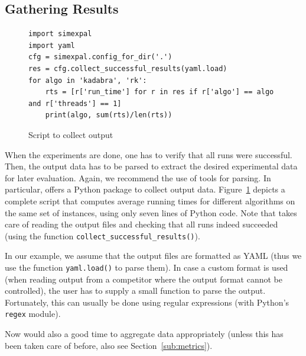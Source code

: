 \documentclass[algorithms,article,submit,moreauthors,pdftex]{Definitions/mdpi}
\begin{document}
\subsection{Gathering Results}
\label{sub:gather-results}
%
\begin{figure}
\scriptsize
\begin{verbatim}
import simexpal
import yaml
cfg = simexpal.config_for_dir('.')
res = cfg.collect_successful_results(yaml.load)
for algo in 'kadabra', 'rk':
    rts = [r['run_time'] for r in res if r['algo'] == algo and r['threads'] == 1]
    print(algo, sum(rts)/len(rts))
\end{verbatim}
\caption{Script to collect \kad output}
\label{fig:exptool_collect}
\end{figure}
%
When the experiments are done, one has to verify that all runs were successful.
Then, the output data has to be parsed to extract the desired experimental
data for later evaluation. Again, we recommend the use of tools for parsing.
In particular, \exptool offers a Python package to collect output data.
Figure~\ref{fig:exptool_collect} depicts a complete script that computes
average running times for different algorithms on the same set of instances,
using only seven lines of Python code.
Note that \exptool takes care of reading the output files and checking that
all runs indeed succeeded (using the function \texttt{collect\_successful\_results()}).

In our example, we assume that the output files are formatted as YAML (thus we use the function
\texttt{yaml.load()} to parse them). In case a custom format is used (\eg when reading output
from a competitor where the output format cannot be controlled), the user has to supply
a small function to parse the output. Fortunately, this can usually be done using
regular expressions (\eg with Python's \texttt{regex} module).

Now would also a good time to aggregate data appropriately (unless this has been taken care of before, also see Section~\ref{sub:metrics}).
\end{document}
